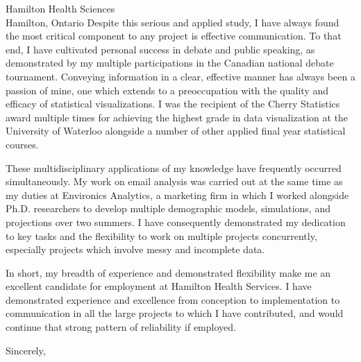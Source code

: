 \documentclass[11pt,a4paper,sans]{letter}
\begin{document}
\begin{letter}{Hamilton Health Sciences \\ Hamilton, Ontario}
		Despite this serious and applied study, I have always found the most critical component to any project is effective communication. To that end, I have cultivated personal success in debate and public speaking, as demonstrated by my multiple participations in the Canadian national debate tournament. Conveying information in a clear, effective manner has always been a passion of mine, one which extends to a preoccupation with the quality and efficacy of statistical visualizations. I was the recipient of the Cherry Statistics award multiple times for achieving the highest grade in data visualization at the University of Waterloo alongside a number of other applied final year statistical courses.
		
		These multidisciplinary applications of my knowledge have frequently occurred simultaneously. My work on email analysis was carried out at the same time as my duties at Environics Analytics, a marketing firm in which I worked alongside Ph.D. researchers to develop multiple demographic models, simulations, and projections over two summers. I have consequently demonstrated my dedication to key tasks and the flexibility to work on multiple projects concurrently, especially projects which involve messy and incomplete data.
		
		In short, my breadth of experience and demonstrated flexibility make me an excellent candidate for employment at Hamilton Health Services. I have demonstrated experience and excellence from conception to implementation to communication in all the large projects to which I have contributed, and would continue that strong pattern of reliability if employed.
		
		
		\closing{Sincerely,}
	\end{letter}
\end{document}
